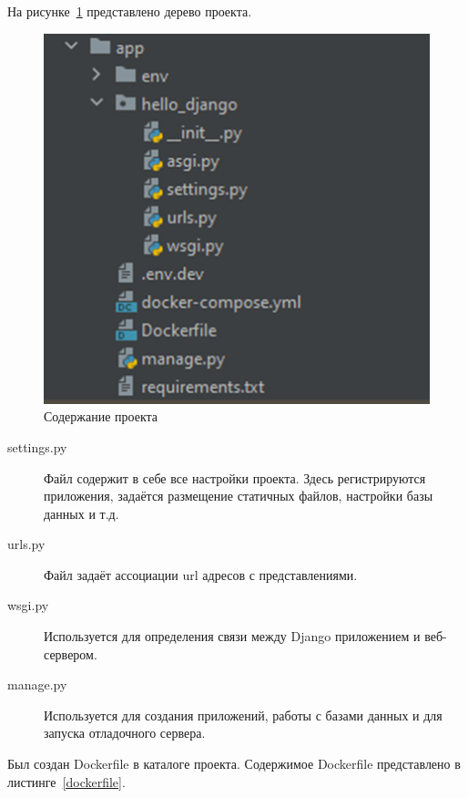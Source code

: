 \def\notedate{2022.10.29}
\def\currentauthor{Василян А.Р. (РК6-73Б)}

На рисунке~\ref{picture1} представлено дерево проекта.
\begin{figure}[!ht]
  \centering
  \includegraphics[scale=0.35]{ResearchNotes/rndhpc_not_gui_2022_10_29/picture1.png}
  \caption{Содержание проекта}
  \label{picture1}
\end{figure}

\begin{description}
	\item[\textsf{settings.py}] Файл содержит в себе все настройки проекта. Здесь регистрируются приложения, задаётся размещение статичных файлов, настройки базы данных и т.д. 
	\item[\textsf{urls.py}] Файл задаёт ассоциации url адресов с представлениями. 
	\item[\textsf{wsgi.py}] Используется для определения связи между Django приложением и веб-сервером.
	\item[\textsf{manage.py}] Используется для создания приложений, работы с базами данных и для запуска отладочного сервера.
\end{description}

	Был создан \textsf{Dockerfile} в каталоге проекта. Содержимое \textsf{Dockerfile} представлено в листинге~\ref{dockerfile}.

